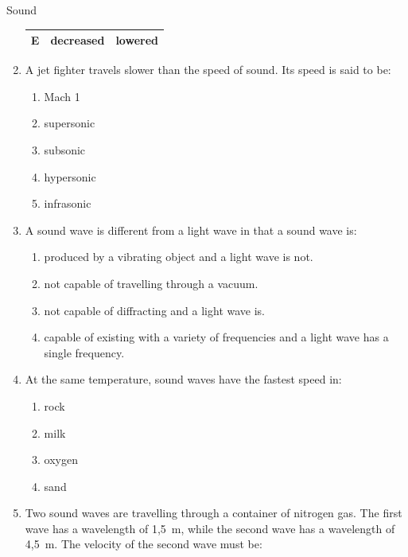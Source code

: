 \begin{eocexercises}{Sound}
\begin{enumerate}[noitemsep, label=\textbf{\arabic*}. ]
\begin{table}[H]
\begin{center}
\begin{tabular}{|l|l|l|}
        E &
        decreased &
        lowered \\ \hline
    \end{tabular}
      \end{center}
\end{table}
    \par
          \label{m38800*uid66}\item A jet fighter travels slower than the speed of sound. Its speed is said to be:
\label{m38800*id186857}\begin{enumerate}[noitemsep, label=\textbf{\alph*}. ] 
            \label{m38800*uid67}\item Mach 1
\label{m38800*uid68}\item supersonic
\label{m38800*uid69}\item subsonic
\label{m38800*uid70}\item hypersonic
\label{m38800*uid71}\item infrasonic
\end{enumerate}
                \label{m38800*uid72}\item A sound wave is different from a light wave in that a sound wave is:
\label{m38800*id186936}\begin{enumerate}[noitemsep, label=\textbf{\alph*}. ] 
            \label{m38800*uid73}\item produced by a vibrating object and a light wave is not.
\label{m38800*uid74}\item not capable of travelling through a vacuum.
\label{m38800*uid75}\item not capable of diffracting and a light wave is.
\label{m38800*uid76}\item capable of existing with a variety of frequencies and a light wave has a single frequency.
\end{enumerate}
                \label{m38800*uid77}\item At the same temperature, sound waves have the fastest speed in:
\label{m38800*id187004}\begin{enumerate}[noitemsep, label=\textbf{\alph*}. ] 
            \label{m38800*uid78}\item rock
\label{m38800*uid79}\item milk
\label{m38800*uid80}\item oxygen
\label{m38800*uid81}\item sand
\end{enumerate}
                \label{m38800*uid82}\item Two sound waves are travelling through a container of nitrogen gas. The first wave has a wavelength of 1,5~m, while the second wave has a wavelength of 4,5~m. The velocity of the second wave must be:

\end{enumerate}
\end{eocexercises}
